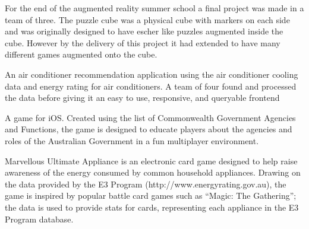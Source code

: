 \documentclass[a4paper]{deedy-resume} %
\begin{document}
\begin{minipage}[t]{0.66\textwidth}
For the end of the augmented reality summer school a final project was made in a team of three. The puzzle cube was a physical cube with markers on each side and was originally designed to have escher like puzzles augmented inside the cube. However by the delivery of this project it had extended to have many different games augmented onto the cube.

\sectionspace %



An air conditioner recommendation application using the air conditioner cooling data and energy rating for air conditioners. A team of four found and processed the data before giving it an easy to use, responsive, and queryable frontend

\sectionspace %



A game for iOS. Created using the list of Commonwealth Government Agencies and Functions, the game is designed to educate players about the agencies and roles of the Australian Government in a fun multiplayer environment.

\sectionspace %



Marvellous Ultimate Appliance is an electronic card game designed to help raise awareness of the energy consumed by common household appliances. Drawing on the data provided by the E3 Program (http://www.energyrating.gov.au), the game is inspired by popular battle card games such as “Magic: The Gathering”; the data is used to provide stats for cards, representing each appliance in the E3 Program database.
\sectionspace %



\end{minipage}
\end{document}
